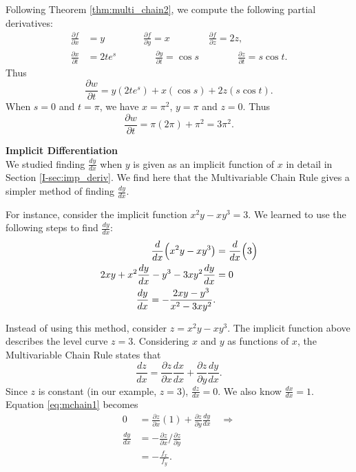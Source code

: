 {Following Theorem \ref{thm:multi_chain2}, we compute the following partial derivatives:
\begin{align*}
\frac{\partial f}{\partial x} &= y\qquad\qquad \frac{\partial f}{\partial y} = x\qquad\qquad \frac{\partial f}{\partial z} = 2z,\\
\frac{\partial x}{\partial t} &= 2te^s\qquad\qquad \frac{\partial y}{\partial t} = \cos s\qquad\qquad \frac{\partial z}{\partial t} = s\cos t.
\end{align*}
Thus 
\[
 \frac{\partial w}{\partial t} = y(2te^s) + x(\cos s) + 2z(s\cos t).
\] 
When $s=0$ and $t=\pi$, we have $x=\pi^2$, $y=\pi$ and $z=0$. Thus
\[
\frac{\partial w}{\partial t} = \pi(2\pi) + \pi^2 = 3\pi^2.
\]
\baselineskip
}\pagebreak

\noindent\textbf{\large Implicit Differentiation}\\

We studied finding $\frac{dy}{dx}$ when $y$ is given as an implicit function of $x$ in detail in Section \ref{I-sec:imp_deriv}. We find here that the Multivariable Chain Rule gives a simpler method of finding $\frac{dy}{dx}$.

For instance, consider the implicit function $x^2y-xy^3=3.$ We learned to use the following steps to find $\frac{dy}{dx}$:
\begin{align}
\frac{d}{dx}\Big(x^2y-xy^3\big) &= \frac{d}{dx}\Big(3\Big) \notag\\
2xy + x^2\frac{dy}{dx}-y^3-3xy^2\frac{dy}{dx} &= 0\notag \\
\frac{dy}{dx} = -\frac{2xy-y^3}{x^2-3xy^2}.\label{eq:mchain2}
\end{align}

Instead of using this method, consider $z=x^2y-xy^3$. The implicit function above describes the level curve $z=3$. Considering $x$ and $y$ as functions of $x$, the Multivariable Chain Rule states that
\begin{equation}\frac{dz}{dx} = \frac{\partial z}{\partial x}\frac{dx}{dx}+\frac{\partial z}{\partial y}\frac{dy}{dx}.\label{eq:mchain1}\end{equation}
Since $z$ is constant (in our example, $z=3$), $\frac{dz}{dx} = 0$. We also know $\frac{dx}{dx} = 1$. Equation \eqref{eq:mchain1} becomes
\begin{align*}
0 &= \frac{\partial z}{\partial x}(1) + \frac{\partial z}{\partial y}\frac{dy}{dx} \quad \Rightarrow\\[5pt]
\frac{dy}{dx} &= -\frac{\partial z}{\partial x}\Big/\frac{\partial z}{\partial y}\\[5pt]
			&= -\frac{\,f_x\,}{f_y}.
\end{align*}

